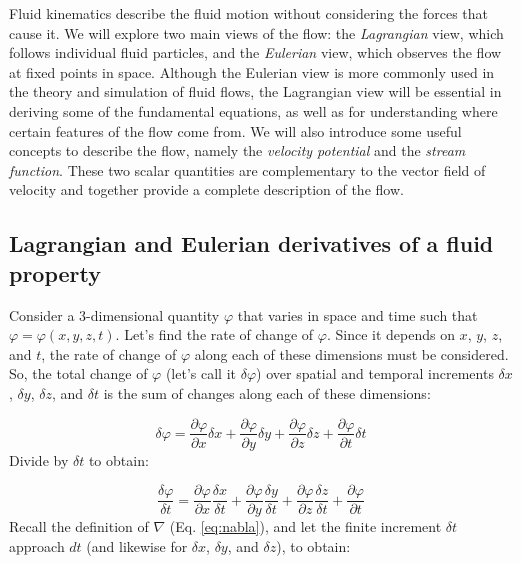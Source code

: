 \documentclass[12pt]{article}
\numberwithin{equation}{section}
\numberwithin{figure}{section}
\numberwithin{table}{section}
\begin{document}
Fluid kinematics describe the fluid motion without considering the forces that
cause it.
We will explore two main views of the flow: the \textit{Lagrangian}
view, which follows individual fluid particles, and the \textit{Eulerian}
view, which observes the flow at fixed points in space.
Although the Eulerian view is more commonly used in the theory and simulation
of fluid flows, the Lagrangian view will be essential in deriving some of the
fundamental equations, as well as for understanding where certain features of
the flow come from.
We will also introduce some useful concepts to describe the flow, namely
the \textit{velocity potential} and the \textit{stream function}.
These two scalar quantities are complementary to the vector field of velocity
and together provide a complete description of the flow.

\subsection{Lagrangian and Eulerian derivatives of a fluid property}

Consider a 3-dimensional quantity $\varphi$ that varies in space and time such that
$\varphi = \varphi(x, y, z, t)$.
Let's find the rate of change of $\varphi$.
Since it depends on $x$, $y$, $z$, and $t$, the rate of change of $\varphi$ along
each of these dimensions must be considered.
So, the total change of $\varphi$ (let's call it $\delta\varphi$) over spatial and
temporal increments $\delta x$, $\delta y$, $\delta z$, and $\delta t$ is the
sum of changes along each of these dimensions:

\begin{equation}
  \delta\varphi = \frac{\partial \varphi}{\partial x} \delta x +
    \frac{\partial \varphi}{\partial y} \delta y +
    \frac{\partial \varphi}{\partial z} \delta z +
    \frac{\partial \varphi}{\partial t} \delta t
\end{equation}
Divide by $\delta t$ to obtain:

\begin{equation}
  \frac{\delta\varphi}{\delta t} = \frac{\partial \varphi}{\partial x} \frac{\delta x}{\delta t} +
    \frac{\partial \varphi}{\partial y} \frac{\delta y}{\delta t} +
    \frac{\partial \varphi}{\partial z} \frac{\delta z}{\delta t} +
    \frac{\partial \varphi}{\partial t}
\end{equation}
Recall the definition of $\nabla$ (Eq. \ref{eq:nabla}), and let the finite
increment $\delta t$ approach $dt$ (and likewise for $\delta x$, $\delta y$, and
$\delta z$), to obtain:
\end{document}
